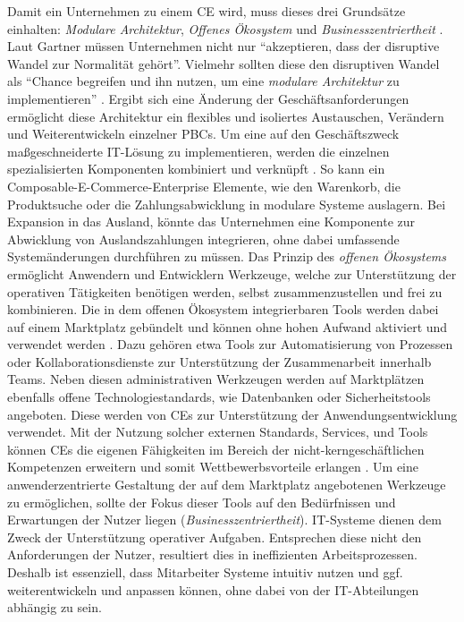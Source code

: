 Damit ein Unternehmen zu einem \ac{CE} wird, muss dieses drei Grundsätze einhalten: \textit{Modulare Architektur}, \textit{Offenes Ökosystem} und \textit{Businesszentriertheit} \cite{.20230313}. Laut Gartner müssen Unternehmen nicht nur \enquote{akzeptieren, dass der disruptive Wandel zur Normalität gehört}. Vielmehr sollten diese den disruptiven Wandel als \enquote{Chance begreifen und ihn nutzen, um eine \textit{modulare Architektur} zu implementieren} \cite{.20230313}. Ergibt sich eine Änderung der Geschäftsanforderungen ermöglicht diese Architektur ein flexibles und isoliertes Austauschen, Verändern und Weiterentwickeln einzelner PBCs. Um eine auf den Geschäftszweck maßgeschneiderte IT-Lösung zu implementieren, werden die einzelnen spezialisierten Komponenten kombiniert und verknüpft \cite[315]{Chang.1019202010232020}. So kann ein Composable-E-Commerce-Enterprise Elemente, wie den Warenkorb, die Produktsuche oder die Zahlungsabwicklung in modulare Systeme auslagern. Bei Expansion in das Ausland, könnte das Unternehmen eine Komponente zur Abwicklung von Auslandszahlungen integrieren, ohne dabei umfassende Systemänderungen durchführen zu müssen. Das Prinzip des \textit{offenen Ökosystems} ermöglicht Anwendern und Entwicklern Werkzeuge, welche zur Unterstützung der operativen Tätigkeiten benötigen werden, selbst zusammenzustellen und frei zu kombinieren. Die in dem offenen Ökosystem integrierbaren Tools werden dabei auf einem Marktplatz gebündelt und können ohne hohen Aufwand aktiviert und verwendet werden \cite[58]{.2009}. Dazu gehören etwa Tools zur Automatisierung von Prozessen oder Kollaborationsdienste zur Unterstützung der Zusammenarbeit innerhalb Teams. Neben diesen administrativen Werkzeugen werden auf Marktplätzen ebenfalls offene Technologiestandards, wie Datenbanken oder Sicherheitstools angeboten. Diese werden von CEs zur Unterstützung der Anwendungsentwicklung verwendet. Mit der Nutzung solcher externen Standards, Services, und Tools können CEs die eigenen Fähigkeiten im Bereich der nicht-kerngeschäftlichen Kompetenzen erweitern und somit Wettbewerbsvorteile erlangen \cite[7]{Sensedia.2020}. Um eine anwenderzentrierte Gestaltung der auf dem Marktplatz angebotenen Werkzeuge zu ermöglichen, sollte der Fokus dieser Tools auf den Bedürfnissen und Erwartungen der Nutzer liegen (\textit{Businesszentriertheit}). IT-Systeme dienen dem Zweck der Unterstützung operativer Aufgaben. Entsprechen diese nicht den Anforderungen der Nutzer, resultiert dies in ineffizienten Arbeitsprozessen. Deshalb ist essenziell, dass Mitarbeiter Systeme intuitiv nutzen und ggf. weiterentwickeln und anpassen können, ohne dabei von der IT-Abteilungen abhängig zu sein.\cite{.20230313} 

